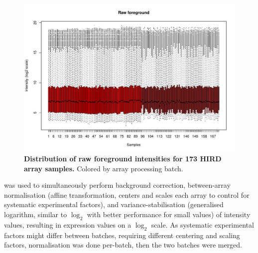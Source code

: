 \begin{figure}
    \centering
    \includegraphics[width=1.0\textwidth,page=1]{mainmatter/figures/chapter_02/array_data_setup.array_intensity_boxplots.pdf}
    \caption{
        \textbf{Distribution of raw foreground intensities for 173 \gls{HIRD} array samples.}
        Colored by array processing batch.
    }
    \label{fig:hird_array_boxplots_raw}
\end{figure}

%
 \autocite{huber2002VarianceStabilizationApplied} was used to simultaneously perform 
background correction, 
between-array normalisation (affine transformation, centers and scales each array to control for systematic experimental factors), 
and variance-stabilisation (generalised logarithm, similar to $\log_2$ with better performance for small values) of intensity values, 
resulting in expression values on a $\log_2$ scale.
As systematic experimental factors might differ between batches, requiring different centering and scaling factors, normalisation was done per-batch, then the two batches were merged.

